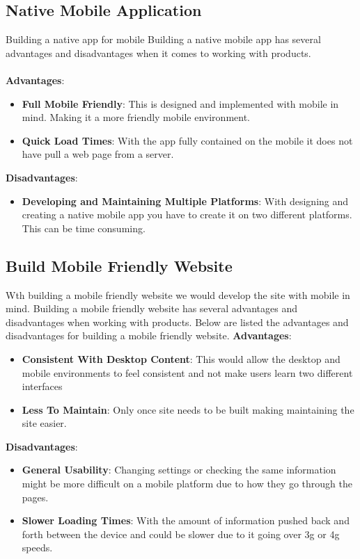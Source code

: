 	\subsection{Native Mobile Application}
	Building a native app for mobile  Building a native mobile
	app has several advantages and disadvantages when it comes to working with
	products.
	\\\\
	\textbf{Advantages}:
	\begin{itemize}
		\item \textbf{Full Mobile Friendly}: This is designed and implemented with
		mobile in mind. Making it a more friendly mobile environment.
		\item \textbf{Quick Load Times}: With the app fully contained on the mobile
		it does not have pull a web page from a server.
	\end{itemize}
	\noindent\textbf{Disadvantages}:
	\begin{itemize}
		\item \textbf{Developing and Maintaining Multiple Platforms}: With designing
		and creating a native mobile app you have to create it on two different platforms.
		This can be time consuming.
	\end{itemize}
	\subsection{Build Mobile Friendly Website}
	Wth building a mobile friendly website we would develop the site with mobile
	in mind. Building a mobile friendly website has several advantages and disadvantages
	when working with products. Below are listed the advantages and disadvantages
	for building a mobile friendly website.
	\textbf{Advantages}:
	\begin{itemize}
		\item \textbf{Consistent With Desktop Content}: This would allow the desktop
		and mobile environments to feel consistent and not make users learn two
		different interfaces
		\item \textbf{Less To Maintain}: Only once site needs to be built making
		maintaining the site easier.
	\end{itemize}
	\textbf{Disadvantages}:
	\begin{itemize}
		\item \textbf{General Usability}: Changing settings or checking the same
		information might be more difficult on a mobile platform due to how they go
		through the pages.
		\item \textbf{Slower Loading Times}: With the amount of information pushed
			back and forth between the device and could be slower due to it going over
			3g or 4g speeds.
	\end{itemize}
